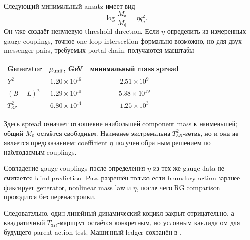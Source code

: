 Следующий минимальный ansatz имеет вид
\begin{equation}
 \log\frac{M_a}{M_0}=\eta q_a^2.
\end{equation}
Он уже создаёт ненулевую threshold direction. Если \(\eta\) определить из
измеренных gauge couplings, точное one-loop intersection формально возможно,
но для двух messenger pairs, требуемых portal-chain, получаются масштабы
\begin{center}
\begin{tabular}{lcc}
\toprule
Generator & \(\mu_{\rm unif}\), GeV & минимальный mass spread \\
\midrule
\(Y^2\) & \(1.20\times10^{16}\) & \(2.51\times10^9\) \\
\((B-L)^2\) & \(1.29\times10^{10}\) & \(5.88\times10^{19}\) \\
\(T_{3R}^2\) & \(6.80\times10^{14}\) & \(1.25\times10^3\) \\
\bottomrule
\end{tabular}
\end{center}
Здесь spread означает отношение наибольшей component mass к наименьшей;
общий \(M_0\) остаётся свободным. Наименее экстремальна \(T_{3R}^2\)-ветвь,
но и она не является предсказанием: coefficient \(\eta\) получен обратным
решением по наблюдаемым couplings.

\begin{nogocriterion}
Совпадение gauge couplings после определения \(\eta\) из тех же gauge data не
считается blind prediction. Pass разрешён только если boundary action заранее
фиксирует generator, nonlinear mass law и \(\eta\), после чего RG comparison
проводится без перенастройки.
\end{nogocriterion}

Следовательно, один линейный динамический коцикл закрыт отрицательно, а
квадратичный \(T_{3R}\)-маршрут остаётся конкретным, но условным кандидатом
для будущего parent-action test. Машинный ledger сохранён в
.